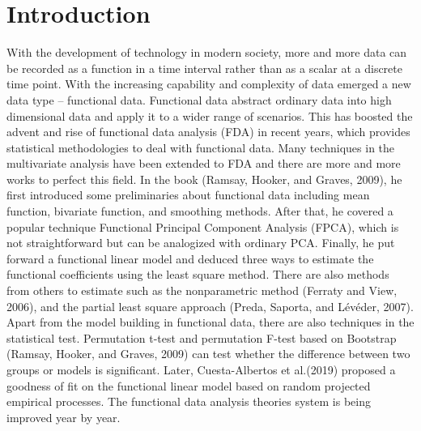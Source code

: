 




\section{Introduction}
With the development of technology in modern society, more and more data can be recorded as a function in a time interval rather than as a scalar at a discrete time point. With the increasing capability and complexity of data emerged a new data type – functional data. Functional data abstract ordinary data into high dimensional data and apply it to a wider range of scenarios. This has boosted the advent and rise of functional data analysis (FDA) in recent years, which provides statistical methodologies to deal with functional data. Many techniques in the multivariate analysis have been extended to FDA and there are more and more works to perfect this field. In the book (Ramsay, Hooker, and Graves, 2009), he first introduced some preliminaries about functional data including mean function, bivariate function, and smoothing methods. After that, he covered a popular technique Functional Principal Component Analysis (FPCA), which is not straightforward but can be analogized with ordinary PCA. Finally, he put forward a functional linear model and deduced three ways to estimate the functional coefficients using the least square method. There are also methods from others to estimate such as the nonparametric method (Ferraty and View, 2006), and the partial least square approach (Preda, Saporta, and Lévéder, 2007). Apart from the model building in functional data, there are also techniques in the statistical test. Permutation t-test and permutation F-test based on Bootstrap (Ramsay, Hooker, and Graves, 2009) can test whether the difference between two groups or models is significant. Later, Cuesta-Albertos et al.(2019) proposed a goodness of fit on the functional linear model based on random projected empirical processes. The functional data analysis theories system is being improved year by year.

